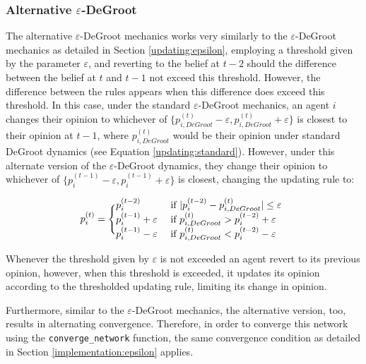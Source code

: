 \documentclass[a4paper, 12pt]{report}
\newcommand{\beli}[3][2]{p_{#2}^{(#3)}}
\begin{document}
\subsubsection{Alternative $\varepsilon$-DeGroot}

The alternative $\varepsilon$-DeGroot mechanics works very similarly to the $\varepsilon$-DeGroot mechanics as detailed in Section \ref{updating:epsilon}, employing a threshold given by the parameter $\varepsilon$, and reverting to the belief at $t-2$ should the difference between the belief at $t$ and $t-1$ not exceed this threshold. However, the difference between the rules appears when this difference does exceed this threshold. In this case, under the standard $\varepsilon$-DeGroot mechanics, an agent $i$ changes their opinion to whichever of $ \{\beli{i, DeGroot}{t}-\varepsilon, \beli{i, DeGroot}{t}+\varepsilon\}$ is closest to their opinion at $t-1$, where $\beli{i, DeGroot}{t}$ would be their opinion under standard DeGroot dynamics (see Equation \ref{updating:standard}). However, under this alternate version of the $\varepsilon$-DeGroot dynamics, they change their opinion to whichever of $\{p_{i}^{(t-1)} - \varepsilon, p_{i}^{(t-1)} + \varepsilon\}$ is closest, changing the updating rule to:

\begin{equation*}
    \label{edegrootalt:updating}
  \beli{i}{t} =\Bigg\{
  \begin{matrix*}[l]
      \beli{i}{t-2} & \text{ if } |\beli{i}{t-2} - \beli{i, DeGroot}{t}| \leq \varepsilon\\
      \beli{i}{t-1} + \varepsilon & \text{ if } \beli{i, DeGroot}{t} > \beli{i}{t-2} + \varepsilon\\
      \beli{i}{t-1} - \varepsilon & \text{ if } \beli{i, DeGroot}{t} < \beli{i}{t-2} - \varepsilon
  \end{matrix*} \\
\end{equation*}

Whenever the threshold given by $\varepsilon$ is not exceeded an agent revert to its previous opinion, however, when this threshold is exceeded, it updates its opinion according to the thresholded updating rule, limiting its change in opinion.

Furthermore, similar to the $\varepsilon$-DeGroot mechanics, the alternative version, too, results in alternating convergence. Therefore, in order to converge this network using the \texttt{converge\_network} function, the same convergence condition as detailed in Section \ref{implementation:epsilon} applies.
\end{document}
